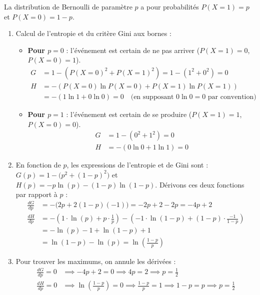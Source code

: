 \documentclass[solutions]{../exercices}
\begin{document}
\begin{solution}
La distribution de Bernoulli de paramètre $p$ a pour probabilités $P(X=1) = p$ et $P(X=0) = 1-p$.
\begin{enumerate}
    \item Calcul de l'entropie et du critère Gini aux bornes :
    \begin{itemize}
        \item \textbf{Pour $p = 0$} : l'événement est certain de ne pas arriver ($P(X=1) = 0$, $P(X=0) = 1$).
        \begin{align*}
            G &= 1 - (P(X=0)^2 + P(X=1)^2) = 1 - (1^2 + 0^2) = 0 \\
            H &= -(P(X=0) \ln P(X=0) + P(X=1) \ln P(X=1)) \\
            &= -(1 \ln 1 + 0 \ln 0) = 0 \quad \text{(en supposant $0 \ln 0 = 0$ par convention)}
        \end{align*}
        \item \textbf{Pour $p = 1$} : l'événement est certain de se produire ($P(X=1) = 1$, $P(X=0) = 0$).
        \begin{align*}
            G &= 1 - (0^2 + 1^2) = 0 \\
            H &= -(0 \ln 0 + 1 \ln 1) = 0
        \end{align*}
    \end{itemize}
    \item En fonction de $p$, les expressions de l'entropie et de Gini sont :
    $G(p) = 1 - \big(p^2 + (1-p)^2\big)$ et $H(p) = -p \ln(p) - (1-p) \ln(1-p)$.
    Dérivons ces deux fonctions par rapport à $p$ :
    \begin{align*}
        \frac{dG}{dp} &= - \Big(2p + 2(1-p)(-1)\Big) = -2p + 2 - 2p = -4p + 2 \\
        \frac{dH}{dp} &= - \left(1 \cdot \ln(p) + p \cdot \frac{1}{p}\right) - \left(-1 \cdot \ln(1-p) + (1-p) \cdot \frac{-1}{1-p}\right) \\
        &= -\ln(p) - 1 + \ln(1-p) + 1 \\
        &= \ln(1-p) - \ln(p) = \ln\left(\frac{1-p}{p}\right)
    \end{align*}
    \item Pour trouver les maximums, on annule les dérivées :
    \begin{align*}
        \frac{dG}{dp} = 0 &\implies -4p + 2 = 0 \implies 4p = 2 \implies p = \frac{1}{2} \\
        \frac{dH}{dp} = 0 &\implies \ln\left(\frac{1-p}{p}\right) = 0 \implies \frac{1-p}{p} = 1 \implies 1-p = p \implies p = \frac{1}{2}

\end{align*}
\end{enumerate}
\end{solution}
\end{document}
